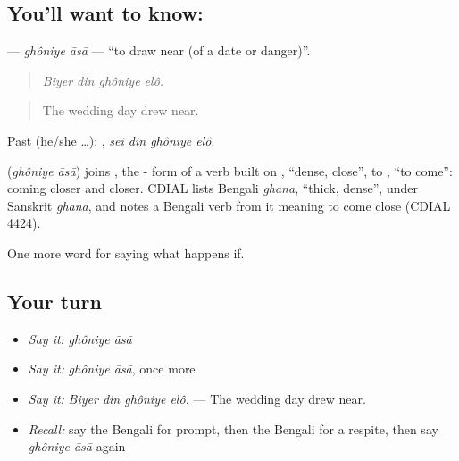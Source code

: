 \subsection*{You'll want to know:  }
\textbf{ } — \emph{ghôniye āsā} — \textquotedblleft{}to draw near (of a date or danger)\textquotedblright{}.

\begin{quote}
   
\end{quote}

\begin{quote}
\emph{Biyer din ghôniye elô.}
\end{quote}

\begin{quote}
The wedding day drew near.
\end{quote}

Past (he/she …):    , \emph{sei din ghôniye elô}.

\begin{cousinweb}
\textbf{ } (\emph{ghôniye āsā}) joins , the - form of a verb built on , \textquotedblleft{}dense, close\textquotedblright{}, to , \textquotedblleft{}to come\textquotedblright{}: coming closer and closer. CDIAL lists Bengali \emph{ghana}, \textquotedblleft{}thick, dense\textquotedblright{}, under Sanskrit \emph{ghana}, and notes a Bengali verb from it meaning to come close (CDIAL 4424).
\end{cousinweb}

\begin{grammarlens}[title={What you've built}]
One more word for saying what happens if.
\end{grammarlens}

\subsection*{Your turn}
\begin{itemize}
\raggedright
  \item \emph{Say it:} \emph{ghôniye āsā}
  \item \emph{Say it:} \emph{ghôniye āsā}, once more
  \item \emph{Say it:} \emph{Biyer din ghôniye elô.} — The wedding day drew near.
  \item \emph{Recall:} say the Bengali for prompt, then the Bengali for a respite, then say \emph{ghôniye āsā} again
\end{itemize}

